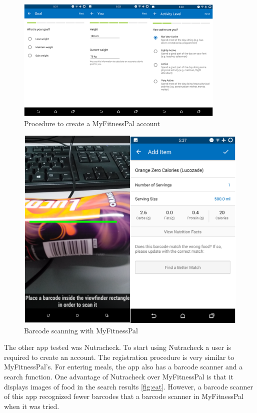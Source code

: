 \begin{figure}[ht]
\centering
\includegraphics[width=10cm]{Figures/2/mfp2.png}
\caption{Procedure to create a MyFitnessPal account}
\label{fig:mfp2}
\end{figure}

\begin{figure}[ht]
\centering
\includegraphics{Figures/2/mfp3.PNG}
\caption{Barcode scanning with MyFitnessPal}
\label{fig:mfp2}
\end{figure}

The other app tested was Nutracheck. To start using Nutracheck a user is required to create an account. The registration procedure is very similar to MyFitnessPal's. For entering meals, the app also has a barcode scanner and a search function. One  advantage of Nutracheck  over MyFitnessPal is that it displays images of food in the search results \autoref{fig:eat}. However,  a  barcode scanner of this app recognized fewer barcodes that a barcode scanner in MyFitnessPal when it was tried.

